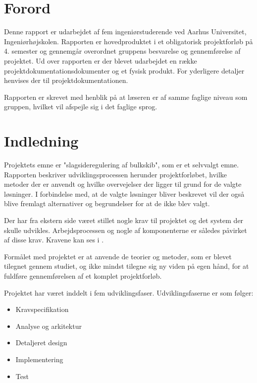 \chapter{Forord}
Denne rapport er udarbejdet af fem ingeniørstuderende ved Aarhus Universitet, Ingeniørhøjskolen. Rapporten er hovedproduktet i et obligatorisk projektforløb på 4. semester og gennemgår overordnet gruppens besvarelse og gennemførelse af projektet. Ud over rapporten er der blevet udarbejdet en række projektdokumentationsdokumenter og et fysisk produkt. For yderligere detaljer henvises der til projektdokumentationen.
 
Rapporten er skrevet med henblik på at læseren er af samme faglige niveau som gruppen, hvilket vil afspejle sig i det faglige sprog. 

\chapter{Indledning}
Projektets emne er "slagsideregulering af bulkskib", som er et selvvalgt emne. Rapporten beskriver udviklingsprocessen herunder projektforløbet, hvilke metoder der er anvendt og hvilke overvejelser der ligger til grund for de valgte løsninger. I forbindelse med, at de valgte løsninger bliver beskrevet vil der også blive fremlagt alternativer og begrundelser for at de ikke blev valgt. 

Der har fra ekstern side været stillet nogle krav til projektet og det system der skulle udvikles. Arbejdsprocessen og nogle af komponenterne er således påvirket af disse krav. Kravene kan ses i .

Formålet med projektet er at anvende de teorier og metoder, som er blevet tilegnet gennem studiet, og ikke mindst tilegne sig ny viden på egen hånd, for at fuldføre gennemførelsen af et komplet projektforløb.

Projektet har været inddelt i fem udviklingsfaser. Udviklingsfaserne er som følger:
\begin{itemize}
\item Kravspecifikation
\item Analyse og arkitektur
\item Detaljeret design
\item Implementering
\item Test
\end{itemize}


